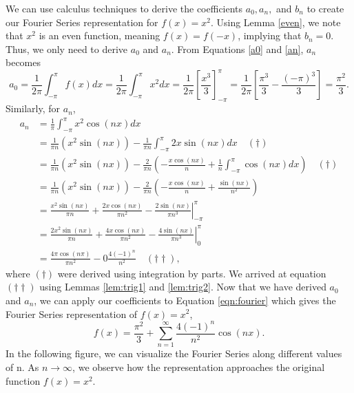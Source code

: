 \documentclass[11pt]{amsart}
\theoremstyle{plain}
\theoremstyle{definition}
\begin{document}
We can use calculus techniques to derive the coefficients $a_0, a_n,$ and $b_n$ to create our Fourier Series representation for $f(x)=x^2$. Using Lemma \ref{even}, we note that $x^2$ is an even function,  meaning $f(x) = f(-x)$, implying that $b_n = 0$. Thus, we only need to derive $a_0$ and $a_n$. From Equations \ref{a0} and \ref{an}, $a_n$ becomes $$a_0 = \frac{1}{2\pi} \int_{-\pi}^\pi f(x) dx = \frac{1}{2\pi} \int_{-\pi}^\pi x^2 dx = \frac{1}{2\pi} \left[\frac{x^3}{3}\right]_{-\pi}^\pi= \frac{1}{2\pi} \left[\frac{\pi^3}{3}-\frac{(-\pi)^3}{3}\right] = \frac{\pi^2}{3}.$$
Similarly, for $a_n$,
\begin{align*}
    a_n &= \frac{1}{\pi}\int_{-\pi}^\pi x^2\cos(nx)dx\\
    &= \frac{1}{\pi n}(x^2\sin(nx))-\frac{1}{\pi n} \int_{-\pi}^\pi 2x\sin(nx)dx \quad (\dagger)\\ 
     &= \frac{1}{\pi n}(x^2\sin(nx)) - \frac{2}{\pi n}\left(-\frac{x\cos(nx)}{n} + \frac{1}{n}\int_{-\pi}^\pi \cos(nx) dx\right) \quad (\dagger)\\
     &= \frac{1}{\pi n}(x^2\sin(nx)) - \frac{2}{\pi n} \left(-\frac{x\cos(nx)}{n} + \frac{\sin(nx)}{n^2}\right)\\
     &= \left.\frac{x^2\sin(nx)}{\pi n}+ \frac{2x\cos(nx)}{\pi n^2}-\frac{2\sin(nx)}{\pi n^3}\right|_{-\pi}^\pi\\
     &= \left.\frac{2x^2\sin(nx)}{\pi n}+ \frac{4x\cos(nx)}{\pi n^2}-\frac{4\sin(nx)}{\pi n^3}\right|_{0}^\pi\\
     &= \frac{4\pi\cos(n\pi)}{\pi n^2} -0 \frac{4(-1)^n}{n^2} \quad (\dagger\dagger),
\end{align*}
where $(\dagger)$ were derived using integration by parts. We arrived at equation $(\dagger\dagger)$ using Lemmas \ref{lem:trig1} and \ref{lem:trig2}. Now that we have derived $a_0$ and $a_n$, we can apply our coefficients to Equation \ref{eqn:fourier} which gives the Fourier Series representation of $f(x)=x^2$,$$f(x)=\dfrac{\pi^2}{3}+\sum_{n=1}^\infty \dfrac{4(-1)^n}{n^2}\cos(nx).$$
In the following figure, we can visualize the Fourier Series along different values of n. As $n\to \infty$, we observe how the representation approaches the original function $f(x)=x^2$.
\end{document}

